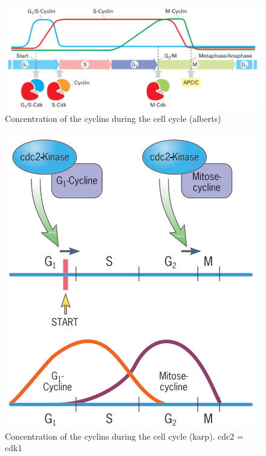 \documentclass{article}
\begin{document}
	\begin{figure}[H]
		\centering
		\includegraphics[width=\linewidth]{cyclin_activity_alberts.png}
		\caption{Concentration of the cyclins during the cell cycle (alberts)}
	\end{figure}

	\begin{figure}[H]
		\centering
		\includegraphics[width=0.8\linewidth]{cyclin_activity_karp.png}
		\caption{Concentration of the cyclins during the cell cycle (karp). cdc2 = cdk1}
	\end{figure}
	
\end{document}
